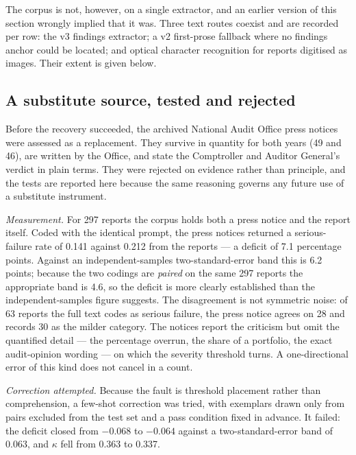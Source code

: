 The corpus is not, however, on a single extractor, and an earlier version of this section wrongly
implied that it was. Three text routes coexist and are recorded per row: the v3 findings
extractor; a v2 first-prose fallback where no findings anchor could be located; and optical
character recognition for reports digitised as images. Their extent is given below.

\subsection*{A substitute source, tested and rejected}

Before the recovery succeeded, the archived National Audit Office press notices were assessed as a
replacement. They survive in quantity for both years (49 and 46), are written by the Office, and
state the Comptroller and Auditor General's verdict in plain terms. They were rejected on evidence
rather than principle, and the tests are reported here because the same reasoning governs any
future use of a substitute instrument.

\emph{Measurement.} For 297 reports the corpus holds both a press notice and the report itself.
Coded with the identical prompt, the press notices returned a serious-failure rate of 0.141
against 0.212 from the reports --- a deficit of 7.1 percentage points. Against an
independent-samples two-standard-error band this is 6.2 points; because the two codings are
\emph{paired} on the same 297 reports the appropriate band is 4.6, so the deficit is more clearly
established than the independent-samples figure suggests. The disagreement is not symmetric noise: of 63 reports the full text codes as serious
failure, the press notice agrees on 28 and records 30 as the milder category. The notices report
the criticism but omit the quantified detail --- the percentage overrun, the share of a portfolio,
the exact audit-opinion wording --- on which the severity threshold turns. A one-directional
error of this kind does not cancel in a count.

\emph{Correction attempted.} Because the fault is threshold placement rather than comprehension,
a few-shot correction was tried, with exemplars drawn only from pairs excluded from the test set
and a pass condition fixed in advance. It failed: the deficit closed from $-0.068$ to $-0.064$
against a two-standard-error band of 0.063, and $\kappa$ fell from 0.363 to 0.337.

